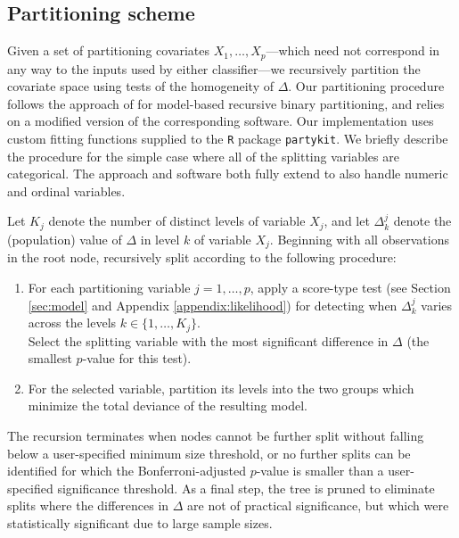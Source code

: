 \documentclass[11pt, sigconf, svgnames]{acmart}
\begin{document}
\subsection{Partitioning scheme}
\label{sec:partition}

Given a set of partitioning covariates $X_1, \ldots, X_p$---which need not
correspond in any way to the inputs used by either classifier---we recursively
partition the covariate space using tests of the homogeneity of $\Delta$.  Our
partitioning procedure follows the approach of \cite{rpartykit, rmob} for
model-based recursive binary partitioning, and relies on a modified version of the
corresponding software.  Our implementation uses custom fitting functions supplied to  the \texttt{R} package \texttt{partykit}.   We briefly describe the procedure for the simple
case where all of the splitting variables are categorical.  The approach and software both fully extend to also handle numeric and ordinal variables.

Let $K_j$ denote the number of distinct levels of variable $X_j$, and let $\Delta^j_k$ denote the (population) value of $\Delta$ in level $k$ of variable $X_j$.   Beginning with all observations in the root node,
recursively split according to the following procedure:

\begin{enumerate}

  \item For each partitioning variable $j = 1, \ldots, p$, apply a score-type test (see Section \ref{sec:model} and Appendix \ref{appendix:likelihood}) for detecting when $\Delta^j_k$ varies across the levels $k \in \{1, \ldots, K_j\}$.  \\
  Select the splitting variable with the most
    significant difference in $\Delta$ (the smallest $p$-value for this test).  

  \item For the selected variable, partition its levels into the two groups
    which minimize the total deviance of the resulting model.

\end{enumerate}



The recursion terminates when nodes cannot be further split without falling below a user-specified minimum size
threshold, or no further splits can be identified for which the Bonferroni-adjusted $p$-value is smaller than a user-specified significance threshold.  As a final step,
the tree is pruned to eliminate splits where the differences in $\Delta$ are not of practical significance, but which were statistically significant due to large sample sizes. 
\end{document}
